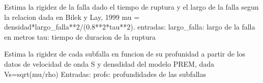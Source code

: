 \documentclass[letterpaper,10pt,english]{sphinxmanual}
\begin{document}
\begin{fulllineitems}
\label{\detokenize{main:main.estima_rigidez}}
\pysigstartsignatures
{}
\pysigstopsignatures
\sphinxAtStartPar
Estima la rigidez de la falla dado el tiempo de ruptura y el largo de la falla
segun la relacion dada en Bilek y Lay, 1999 mu = densidad*largo\_falla**2/(0.8**2*tau**2).
entradas: 
largo\_falla: largo de la falla en metros
tau: tiempo de duracion de la ruptura

\end{fulllineitems}


\begin{fulllineitems}
\label{\detokenize{main:main.estima_rigidez_prem}}
\pysigstartsignatures
{}
\pysigstopsignatures
\sphinxAtStartPar
Estima la rigidez de cada subfalla en funcion de su profunidad a partir de los 
datos de velocidad de onda S y densdidad del modelo PREM, dada Vs=sqrt(mu/rho)
Entradas:
profs: profundidades de las subfallas

\end{fulllineitems}


\begin{fulllineitems}
\label{\detokenize{main:main.hypocenter}}
\pysigstartsignatures
{}
\pysigstopsignatures
\end{fulllineitems}


\begin{fulllineitems}
\label{\detokenize{main:main.interp_slabtofault}}
\pysigstartsignatures
{}
\pysigstopsignatures
\end{fulllineitems}
\end{document}
